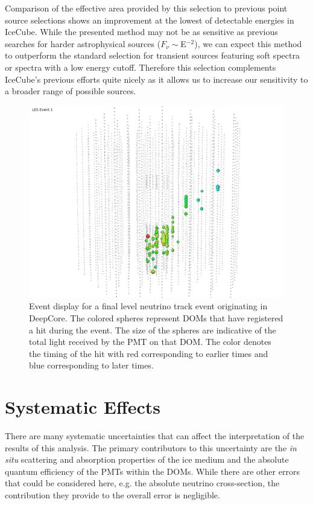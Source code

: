 \documentclass{gatech-thesis}
\begin{document}
Comparison of the effective area provided by this selection to previous point source selections shows an improvement at the lowest of detectable energies in IceCube. While the presented method may not be as sensitive as previous searches for harder astrophysical sources ($F_{\nu}\sim$E$^{-2}$), we can expect this method to outperform the standard selection for transient sources featuring soft spectra or spectra with a low energy cutoff. Therefore this selection complements IceCube's previous efforts quite nicely as it allows us to increase our sensitivity to a broader range of possible sources. 

\begin{figure}[ht]
  \begin{center}
    \includegraphics[width=1.0\textwidth,keepaspectratio]{LESEventForThesis.png}
  \end{center}
  \caption[Final Level Event Display]{Event display for a final level neutrino track event originating in DeepCore. The colored spheres represent DOMs that have registered a hit during the event. The size of the spheres are indicative of the total light received by the PMT on that DOM. The color denotes the timing of the hit with red corresponding to earlier times and blue corresponding to later times.}
  \label{fig:LESEventFinal}
\end{figure}

\chapter{Systematic Effects}
There are many systematic uncertainties that can affect the interpretation of the results of this analysis. The primary contributors to this uncertainty are the \textit{in situ} scattering and absorption properties of the ice medium and the absolute quantum efficiency of the PMTs within the DOMs. While there are other errors that could be considered here, e.g. the absolute neutrino cross-section, the contribution they provide to the overall error is negligible.
\end{document}
